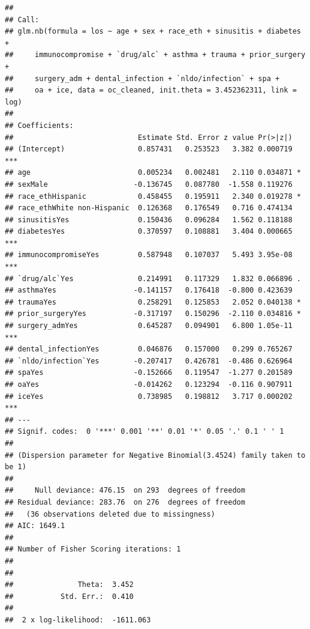 \documentclass[
]{article}
\begin{document}
\begin{verbatim}
## 
## Call:
## glm.nb(formula = los ~ age + sex + race_eth + sinusitis + diabetes + 
##     immunocompromise + `drug/alc` + asthma + trauma + prior_surgery + 
##     surgery_adm + dental_infection + `nldo/infection` + spa + 
##     oa + ice, data = oc_cleaned, init.theta = 3.452362311, link = log)
## 
## Coefficients:
##                             Estimate Std. Error z value Pr(>|z|)    
## (Intercept)                 0.857431   0.253523   3.382 0.000719 ***
## age                         0.005234   0.002481   2.110 0.034871 *  
## sexMale                    -0.136745   0.087780  -1.558 0.119276    
## race_ethHispanic            0.458455   0.195911   2.340 0.019278 *  
## race_ethWhite non-Hispanic  0.126368   0.176549   0.716 0.474134    
## sinusitisYes                0.150436   0.096284   1.562 0.118188    
## diabetesYes                 0.370597   0.108881   3.404 0.000665 ***
## immunocompromiseYes         0.587948   0.107037   5.493 3.95e-08 ***
## `drug/alc`Yes               0.214991   0.117329   1.832 0.066896 .  
## asthmaYes                  -0.141157   0.176418  -0.800 0.423639    
## traumaYes                   0.258291   0.125853   2.052 0.040138 *  
## prior_surgeryYes           -0.317197   0.150296  -2.110 0.034816 *  
## surgery_admYes              0.645287   0.094901   6.800 1.05e-11 ***
## dental_infectionYes         0.046876   0.157000   0.299 0.765267    
## `nldo/infection`Yes        -0.207417   0.426781  -0.486 0.626964    
## spaYes                     -0.152666   0.119547  -1.277 0.201589    
## oaYes                      -0.014262   0.123294  -0.116 0.907911    
## iceYes                      0.738985   0.198812   3.717 0.000202 ***
## ---
## Signif. codes:  0 '***' 0.001 '**' 0.01 '*' 0.05 '.' 0.1 ' ' 1
## 
## (Dispersion parameter for Negative Binomial(3.4524) family taken to be 1)
## 
##     Null deviance: 476.15  on 293  degrees of freedom
## Residual deviance: 283.76  on 276  degrees of freedom
##   (36 observations deleted due to missingness)
## AIC: 1649.1
## 
## Number of Fisher Scoring iterations: 1
## 
## 
##               Theta:  3.452 
##           Std. Err.:  0.410 
## 
##  2 x log-likelihood:  -1611.063
\end{verbatim}
\end{document}
